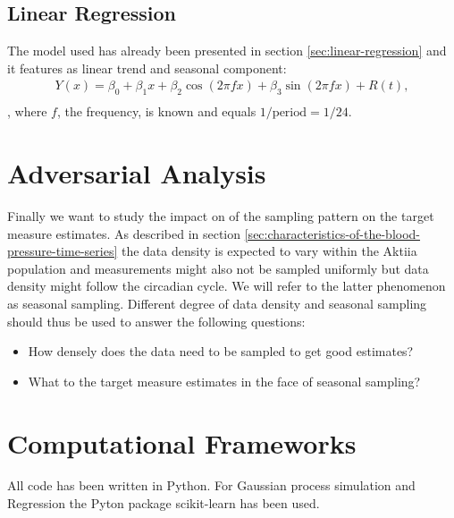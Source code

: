 \subsection{Linear Regression}

The model used has already been presented in section \ref{sec:linear-regression} and
it features as linear trend and seasonal component:
\begin{gather*}
Y(x) = \beta_0 + \beta_1 x + \beta_2 \cos(2 \pi f x) + \beta_3 \sin(2 \pi f x) + R(t), \\
\end{gather*}
, where $f$, the frequency, is known and equals $1/\text{period} = 1/24$.









\section{Adversarial Analysis}\label{sec:adversarial-analysis}

Finally we want to study the impact on of the sampling pattern on the target measure estimates.
As described in section \ref{sec:characteristics-of-the-blood-pressure-time-series}
the data density is expected to vary within the Aktiia population and
measurements might
also not be sampled uniformly but data density might follow the circadian cycle.
We will refer to the latter phenomenon as seasonal sampling.
Different degree of data density and seasonal sampling should thus be used to
answer the following questions:
\begin{itemize}
    \item How densely does the data need to be sampled to get good estimates?
    \item What to the target measure estimates in the face of seasonal sampling?
\end{itemize}



\section{Computational Frameworks}

All code has been written in Python.
For Gaussian process simulation and Regression the Pyton package scikit-learn
has been used.

















